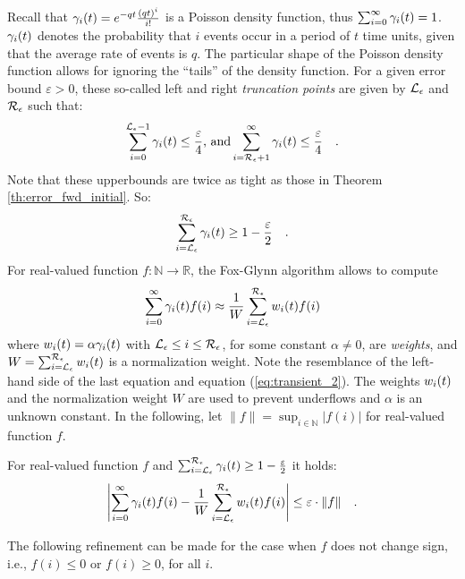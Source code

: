 \documentclass{entcs}
\begin{document}
	Recall that  $\gamma_{i}(t) = e^{-q t}\frac{\left( q t \right)^{i}}{i!}$ is a Poisson density function, thus $\sum_{i=0}^{\infty}\gamma_{i}(t) = 1$.  $\gamma_{i}(t)$ denotes the probability that $i$ events occur in a period of $t$ time units, given that the average rate of events is $q$.  The particular shape of the Poisson density function allows for ignoring the ``tails'' of the density function.  For a given error bound $\varepsilon > 0$, these so-called left and right \emph{truncation points} are given by $\mathcal{L}_{\epsilon}$ and $\mathcal{R}_{\epsilon}$ such that:
	\[
		\sum_{i=0}^{\mathcal{L}_{\epsilon}{-}1}\gamma_{i}(t) \leq \frac{\varepsilon}{4} \text{, and} \sum_{i=\mathcal{R}_{\epsilon}{+}1}^{\infty}\gamma_{i}(t) \leq \frac{\varepsilon}{4} \quad .
	\]
	Note that these upperbounds are twice as tight as those in Theorem \ref{th:error_fwd_initial}. So:
	\[
		\sum_{i=\mathcal{L}_{\epsilon}}^{\mathcal{R}_{\epsilon}}\gamma_{i}(t) \geq 1 - \frac{\varepsilon}{2} \quad .
	\]
	For real-valued function $f : \mathbb{N} \to \mathbb{R}$, the Fox-Glynn algorithm \cite{FoxG_ACM88} allows to compute
	\[
	 	\sum_{i=0}^{\infty} \gamma_{i}(t) f(i) \approx \frac{1}{W}\sum_{i = \mathcal{L}_{\epsilon}}^{\mathcal{R}_{\epsilon}} w_{i}(t) f(i)
	\]
	 where $w_{i}(t) = \alpha \gamma_{i}(t)$ with $\mathcal{L}_{\epsilon} \leq i \leq \mathcal{R}_{\epsilon}$, for some constant $\alpha \neq 0$, are \emph{weights}, and $W = \sum_{i=\mathcal{L}_{\epsilon}}^{\mathcal{R}_{\epsilon}} w_{i}(t)$ is a normalization weight.  Note the resemblance of the left-hand side of the last equation and equation (\ref{eq:transient_2}).  The weights $w_{i}(t)$ and the normalization weight $W$ are used to prevent underflows and $\alpha$ is an unknown constant. In the following, let $\|f\| = \sup_{i \in \mathbb{N}}|f(i)|$ for real-valued function $f$.
	
	\begin{proposition}
		\cite{FoxG_ACM88} For real-valued function $f$ and $\sum_{i=\mathcal{L}_{\epsilon}}^{\mathcal{R}_{\epsilon}} \gamma_{i}(t) \geq 1 - \frac{\varepsilon}{2}$ it holds:
		{\small
		\[
			\left| \sum_{i=0}^{\infty} \gamma_{i}(t) f(i) - \frac{1}{W}\sum_{i = \mathcal{L}_{\epsilon}}^{\mathcal{R}_{\epsilon}} w_{i}(t) f(i) \right| \leq \varepsilon \cdot \|f\| \quad .
		\]
		}
	\end{proposition}

	The following refinement can be made for the case when $f$ does not change sign, i.e., $f(i) \leq 0$ or $f(i) \geq 0$, for all $i$.
\end{document}
